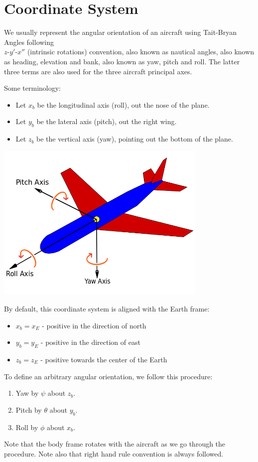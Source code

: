 \documentclass[12pt]{article}
\begin{document}
	\section{Coordinate System}
	
	We usually represent the angular orientation of an aircraft using Tait-Bryan Angles following \\
	$z$-$y'$-$x''$ (intrinsic rotations) convention, also known as nautical angles, 
	also known as heading, elevation and bank, also known as yaw, pitch and roll. 
	The latter three terms are also used for the three aircraft principal axes.
	
	Some terminology:
	\begin{itemize}
		\item Let $x_b$ be the longitudinal axis (roll), out the nose of the plane.
		\item Let $y_b$ be the lateral axis (pitch), out the right wing.
		\item Let $z_b$ be the vertical axis (yaw), pointing out the bottom of the plane.
	\end{itemize}
	
	\includegraphics[width=4in]{aircraft_axes.png}
	
	By default, this coordinate system is aligned with the Earth frame:
	\begin{itemize}
		\item $x_b = x_E$ - positive in the direction of north
		\item $y_b = y_E$ - positive in the direction of east
		\item $z_b = z_E$ - positive towards the center of the Earth
	\end{itemize}
	
	To define an arbitrary angular orientation, we follow this procedure:
	\begin{enumerate}
		\item Yaw by $\psi$ about $z_b$.
		\item Pitch by $\theta$ about $y_b$.
		\item Roll by $\phi$ about $x_b$.
	\end{enumerate}
	Note that the body frame rotates with the aircraft as we go through the procedure. 
	Note also that right hand rule convention is always followed. 
	
\end{document}
